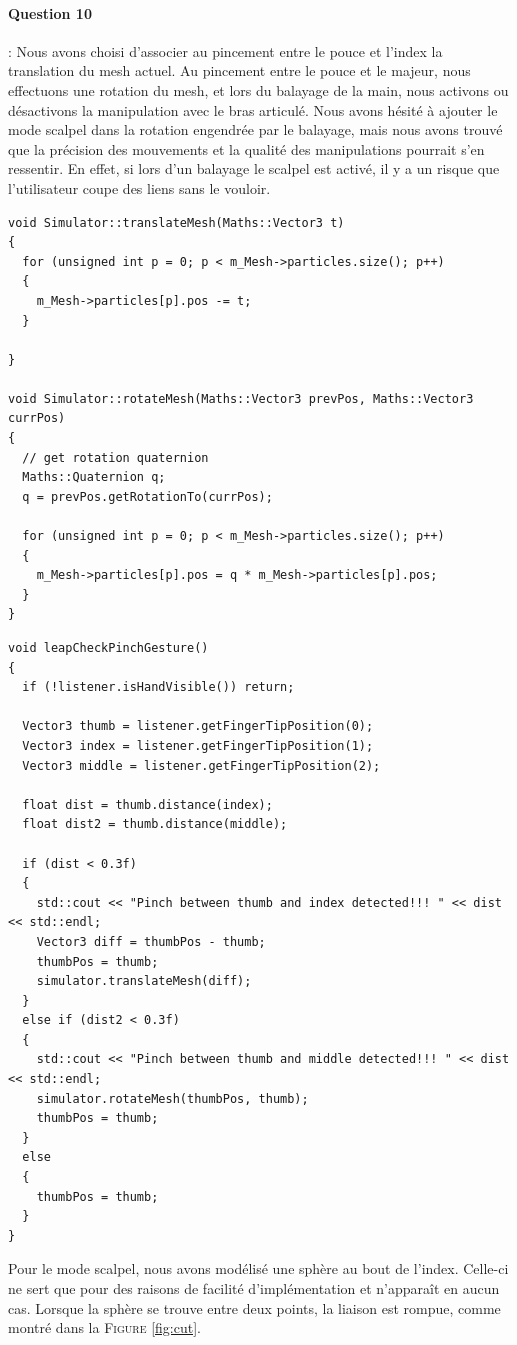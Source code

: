 \documentclass[a4paper,12pt]{article}
\begin{document}
\paragraph{Question 10} : Nous avons choisi d'associer au pincement entre le pouce et l'index la translation du mesh actuel. Au pincement entre le pouce et le majeur, nous effectuons une rotation du mesh, et lors du balayage de la main, nous activons ou désactivons la manipulation avec le bras articulé. Nous avons hésité à ajouter le mode \og{}scalpel\fg{} dans la rotation engendrée par le balayage, mais nous avons trouvé que la précision des mouvements et la qualité des manipulations pourrait s'en ressentir. En effet, si lors d'un balayage le scalpel est activé, il y a un risque que l'utilisateur coupe des liens sans le vouloir.
\begin{lstlisting}
void Simulator::translateMesh(Maths::Vector3 t)
{
  for (unsigned int p = 0; p < m_Mesh->particles.size(); p++)
  {
    m_Mesh->particles[p].pos -= t;
  }
  
}

void Simulator::rotateMesh(Maths::Vector3 prevPos, Maths::Vector3 currPos)
{
  // get rotation quaternion
  Maths::Quaternion q;
  q = prevPos.getRotationTo(currPos);

  for (unsigned int p = 0; p < m_Mesh->particles.size(); p++)
  {
    m_Mesh->particles[p].pos = q * m_Mesh->particles[p].pos;
  }
}
\end{lstlisting}
\begin{lstlisting}
void leapCheckPinchGesture()
{
  if (!listener.isHandVisible()) return;

  Vector3 thumb = listener.getFingerTipPosition(0);
  Vector3 index = listener.getFingerTipPosition(1);
  Vector3 middle = listener.getFingerTipPosition(2);
  
  float dist = thumb.distance(index);
  float dist2 = thumb.distance(middle);

  if (dist < 0.3f)
  {
    std::cout << "Pinch between thumb and index detected!!! " << dist << std::endl;
    Vector3 diff = thumbPos - thumb;
    thumbPos = thumb;
    simulator.translateMesh(diff);
  }
  else if (dist2 < 0.3f)
  {
    std::cout << "Pinch between thumb and middle detected!!! " << dist << std::endl;
    simulator.rotateMesh(thumbPos, thumb);
    thumbPos = thumb;
  }
  else
  {
    thumbPos = thumb;
  }
}
\end{lstlisting}

Pour le mode \og{}scalpel\fg{}, nous avons modélisé une sphère au bout de l'index. Celle-ci ne sert que pour des raisons de facilité d'implémentation et n'apparaît en aucun cas. Lorsque la sphère se trouve entre deux points, la liaison est rompue, comme montré dans la \textsc{Figure} \ref{fig:cut}.
\end{document}
